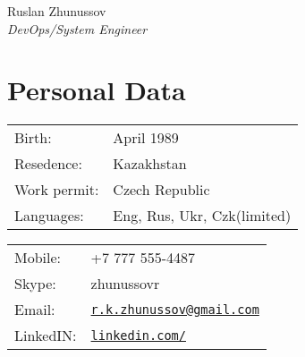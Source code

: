 \documentclass[a4paper,10pt]{article}
\def\name{Ruslan Zhunussov}
\begin{document}
{\huge \name \\}
\textit{DevOps/System Engineer}

\section*{Personal Data}
\begin{minipage}{0.45\linewidth}
    \begin{tabular}{ll}
        Birth: &  April 1989\\
        Resedence: &  Kazakhstan \\
        Work permit: & Czech Republic \\
        Languages: & Eng, Rus, Ukr, Czk(limited) \\
      \end{tabular}
\end{minipage}
\begin{minipage}{0.45\linewidth}
    \begin{tabular}{ll}
      Mobile: & +7 777 555-4487 \\
      Skype: &  zhunussovr \\
      Email: & \href{mailto:r.k.zhunussov@gmail.com}{\tt r.k.zhunussov@gmail.com} \\
      LinkedIN: & \href{https://www.linkedin.com/in/ruslan-zhunussov-6b575a5a}{\tt linkedin.com/} \\
    \end{tabular}
\end{minipage}
\end{document}
